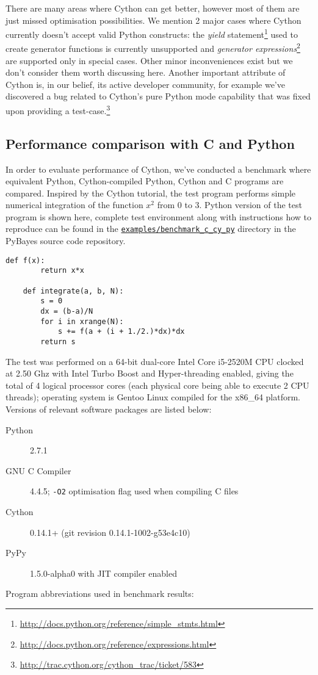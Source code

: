 There are many areas where Cython can get better, however most of them are just missed optimisation
possibilities. We mention 2 major cases where Cython currently doesn't accept valid Python constructs:
the \emph{yield} statement\footnote{\url{http://docs.python.org/reference/simple_stmts.html}}
used to create generator functions is currently unsupported and
\emph{generator expressions}\footnote{\url{http://docs.python.org/reference/expressions.html}}
are supported only in special cases. Other minor inconveniences exist but we don't consider them
worth discussing here. Another important attribute of Cython is, in our belief, its active developer
community, for example we've discovered a bug related to Cython's pure Python mode capability that
was fixed upon providing a test-case.\footnote{\url{http://trac.cython.org/cython_trac/ticket/583}}

\subsection{Performance comparison with C and Python} \label{sec:CythonPerformace}

In order to evaluate performance of Cython, we've conducted a benchmark where equivalent Python,
Cython-compiled Python, Cython and C programs are compared. Inspired by the Cython tutorial, the
test program performs simple numerical integration of the function \(x^2\) from 0 to 3. Python
version of the test program is shown here, complete test environment along with instructions how
to reproduce can be found in the
\href{http://github.com/strohel/PyBayes/tree/master/examples/benchmark_c_cy_py}{\nolinkurl{examples/benchmark_c_cy_py}}
directory in the PyBayes source code repository.
\begin{Verbatim}[samepage=true,gobble=1,label=integrate\_python.py,frame=single]
	def f(x):
	    return x*x

	def integrate(a, b, N):
	    s = 0
	    dx = (b-a)/N
	    for i in xrange(N):
	        s += f(a + (i + 1./2.)*dx)*dx
	    return s
\end{Verbatim}
The test was performed on a 64-bit dual-core Intel Core i5-2520M CPU clocked at 2.50 Ghz with Intel Turbo
Boost and Hyper-threading enabled, giving the total of 4 logical processor cores (each physical core
being able to execute 2 CPU threads); operating system is Gentoo Linux compiled for the x86\_64
platform. Versions of relevant software packages are listed below:
\begin{description}
	\item[Python] 2.7.1
	\item[GNU C Compiler] 4.4.5; \verb|-O2| optimisation flag used when compiling C files
	\item[Cython] 0.14.1+ (git revision 0.14.1-1002-g53e4c10)
	\item[PyPy] 1.5.0-alpha0 with JIT compiler enabled
\end{description}
Program abbreviations used in benchmark results:

